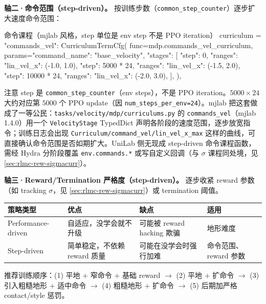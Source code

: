 \textbf{轴二·命令范围（step-driven）。} 按训练步数（\verb|common_step_counter|）逐步扩大速度命令范围：

\begin{codebox}[Python]{命令课程（mjlab 风格，step 单位是 env step 不是 PPO iteration）}
curriculum = {
    "commands_vel": CurriculumTermCfg(
        func=mdp.commands_vel_curriculum,
        params={"command_name": "base_velocity", "stages": [
            {"step": 0,          "ranges": {"lin_vel_x": (-1.0, 1.0)}},
            {"step": 5000 * 24,  "ranges": {"lin_vel_x": (-1.5, 2.0)}},
            {"step": 10000 * 24, "ranges": {"lin_vel_x": (-2.0, 3.0)}},
        ]},
    ),
}
\end{codebox}

注意 step 是 \verb|common_step_counter|（env steps），不是 PPO iteration。$5000\times24$ 大约对应第 $5000$ 个 PPO update（因 \verb|num_steps_per_env=24|）。mjlab 把这套做成了一等公民：\verb|tasks/velocity/mdp/curriculums.py| 的 \verb|commands_vel|（mjlab 1.4.0）用一个 \verb|VelocityStage| TypedDict 声明各阶段的速度范围，逐步放宽指令；训练日志会出现 \verb|Curriculum/command_vel/lin_vel_x_max| 这样的曲线，可直接确认命令范围是否如期扩大。UniLab 侧无现成 step-driven 命令课程函数，需经 Hydra 分阶段覆盖 \verb|env.commands.*| 或写自定义回调（与 $\sigma$ 课程同处境，见 \cref{sec:rlmc-rew-sigmacurr}）。

\textbf{轴三·Reward/Termination 严格度（step-driven）。} 逐步收紧 reward 参数（如 tracking $\sigma$，见 \cref{sec:rlmc-rew-sigmacurr}）或 termination 阈值。

\begin{center}
\small
\begin{tabular}{@{}llll@{}}
\toprule
策略类型 & 优点 & 缺点 & 适用 \\
\midrule
Performance-driven & 自适应，没学会就不升级 & 可能被 reward hacking 欺骗 & 地形难度 \\
Step-driven & 简单稳定，不依赖 reward 质量 & 可能在没学会时强行加难 & 命令范围、reward 参数 \\
\bottomrule
\end{tabular}
\end{center}

推荐训练顺序：(1) 平地 $+$ 窄命令 $+$ 基础 reward $\to$ (2) 平地 $+$ 扩命令 $\to$ (3) 引入粗糙地形 $+$ 适中命令 $\to$ (4) 粗糙地形 $+$ 扩命令 $\to$ (5) 后期加严格 contact/style 惩罚。

